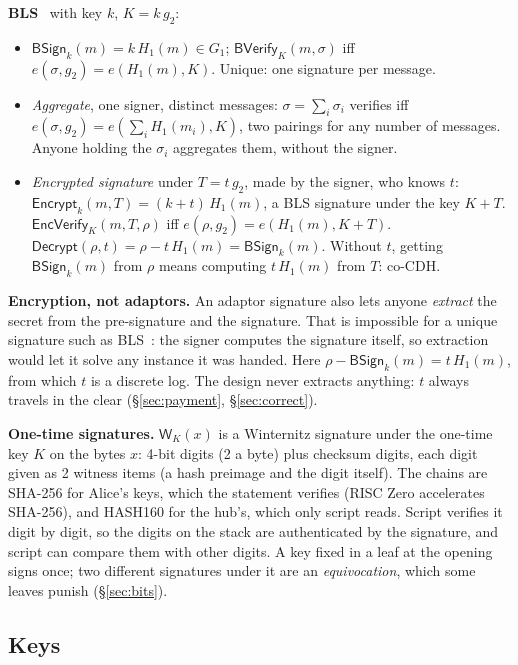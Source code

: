 \documentclass[11pt]{article}
\theoremstyle{plain}
\theoremstyle{definition}
\newcommand{\Wots}{\mathsf{W}}
\newcommand{\BSign}{\mathsf{BSign}}
\newcommand{\BVfy}{\mathsf{BVerify}}
\newcommand{\Enc}{\mathsf{Encrypt}}
\newcommand{\EVfy}{\mathsf{EncVerify}}
\newcommand{\Dec}{\mathsf{Decrypt}}
\newcommand{\Hg}{H_{1}}
\begin{document}
\textbf{BLS}~\cite{bls} with key $k$, $K = k\,g_2$:
\begin{itemize}[nosep]
\item $\BSign_k(m) = k\,\Hg(m) \in G_1$; $\BVfy_K(m, \sigma)$ iff
  $e(\sigma, g_2) = e(\Hg(m), K)$. Unique: one signature per message.
\item \emph{Aggregate}, one signer, distinct messages: $\sigma = \sum_i
  \sigma_i$ verifies iff $e(\sigma, g_2) = e(\sum_i \Hg(m_i), K)$, two
  pairings for any number of messages. Anyone holding the $\sigma_i$
  aggregates them, without the signer.
\item \emph{Encrypted signature} under $T = t\,g_2$, made by the signer,
  who knows $t$: $\Enc_k(m, T) = (k + t)\,\Hg(m)$, a BLS signature under
  the key $K + T$. $\EVfy_K(m, T, \rho)$ iff $e(\rho, g_2) = e(\Hg(m), K
  + T)$. $\Dec(\rho, t) = \rho - t\,\Hg(m) = \BSign_k(m)$. Without $t$,
  getting $\BSign_k(m)$ from $\rho$ means computing $t\,\Hg(m)$ from
  $T$: co-CDH.
\end{itemize}

\textbf{Encryption, not adaptors.} An adaptor signature also lets
anyone \emph{extract} the secret from the pre-signature and the
signature. That is impossible for a unique signature such as
BLS~\cite{erwig}: the signer computes the signature itself, so
extraction would let it solve any instance it was handed. Here
$\rho - \BSign_k(m) = t\,\Hg(m)$, from which $t$ is a discrete log. The
design never extracts anything: $t$ always travels in the clear
(\S\ref{sec:payment}, \S\ref{sec:correct}).

\textbf{One-time signatures.} $\Wots_K(x)$ is a Winternitz signature
under the one-time key $K$ on the bytes $x$: 4-bit digits (2 a byte)
plus checksum digits, each digit given as 2 witness items (a hash
preimage and the digit itself). The chains are SHA-256 for Alice's keys, which the
statement verifies (RISC Zero accelerates SHA-256), and HASH160 for the
hub's, which only script reads. Script verifies it
digit by digit, so the digits on the stack are authenticated by the
signature, and script can compare them with other digits. A key fixed
in a leaf at the opening signs once; two different signatures under it
are an \emph{equivocation}, which some leaves punish
(\S\ref{sec:bits}).

\subsection{Keys}
\end{document}
